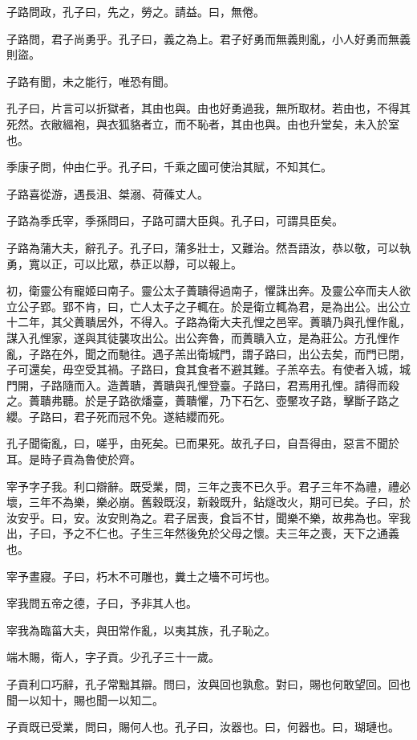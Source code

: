 子路問政，孔子曰，先之，勞之。請益。曰，無倦。

子路問，君子尚勇乎。孔子曰，義之為上。君子好勇而無義則亂，小人好勇而無義則盜。

子路有聞，未之能行，唯恐有聞。

孔子曰，片言可以折獄者，其由也與。由也好勇過我，無所取材。若由也，不得其死然。衣敝縕袍，與衣狐貉者立，而不恥者，其由也與。由也升堂矣，未入於室也。

季康子問，仲由仁乎。孔子曰，千乘之國可使治其賦，不知其仁。

子路喜從游，遇長沮、桀溺、荷蓧丈人。

子路為季氏宰，季孫問曰，子路可謂大臣與。孔子曰，可謂具臣矣。

子路為蒲大夫，辭孔子。孔子曰，蒲多壯士，又難治。然吾語汝，恭以敬，可以執勇，寬以正，可以比眾，恭正以靜，可以報上。

初，衛靈公有寵姬曰南子。靈公太子蕢聵得過南子，懼誅出奔。及靈公卒而夫人欲立公子郢。郢不肯，曰，亡人太子之子輒在。於是衛立輒為君，是為出公。出公立十二年，其父蕢聵居外，不得入。子路為衛大夫孔悝之邑宰。蕢聵乃與孔悝作亂，謀入孔悝家，遂與其徒襲攻出公。出公奔魯，而蕢聵入立，是為莊公。方孔悝作亂，子路在外，聞之而馳往。遇子羔出衛城門，謂子路曰，出公去矣，而門已閉，子可還矣，毋空受其禍。子路曰，食其食者不避其難。子羔卒去。有使者入城，城門開，子路隨而入。造蕢聵，蕢聵與孔悝登臺。子路曰，君焉用孔悝。請得而殺之。蕢聵弗聽。於是子路欲燔臺，蕢聵懼，乃下石乞、壺黶攻子路，擊斷子路之纓。子路曰，君子死而冠不免。遂結纓而死。

孔子聞衛亂，曰，嗟乎，由死矣。已而果死。故孔子曰，自吾得由，惡言不聞於耳。是時子貢為魯使於齊。

宰予字子我。利口辯辭。既受業，問，三年之喪不已久乎。君子三年不為禮，禮必壞，三年不為樂，樂必崩。舊穀既沒，新穀既升，鉆燧改火，期可已矣。子曰，於汝安乎。曰，安。汝安則為之。君子居喪，食旨不甘，聞樂不樂，故弗為也。宰我出，子曰，予之不仁也。子生三年然後免於父母之懷。夫三年之喪，天下之通義也。

宰予晝寢。子曰，朽木不可雕也，糞土之墻不可圬也。

宰我問五帝之德，子曰，予非其人也。

宰我為臨菑大夫，與田常作亂，以夷其族，孔子恥之。

端木賜，衛人，字子貢。少孔子三十一歲。

子貢利口巧辭，孔子常黜其辯。問曰，汝與回也孰愈。對曰，賜也何敢望回。回也聞一以知十，賜也聞一以知二。

子貢既已受業，問曰，賜何人也。孔子曰，汝器也。曰，何器也。曰，瑚璉也。

